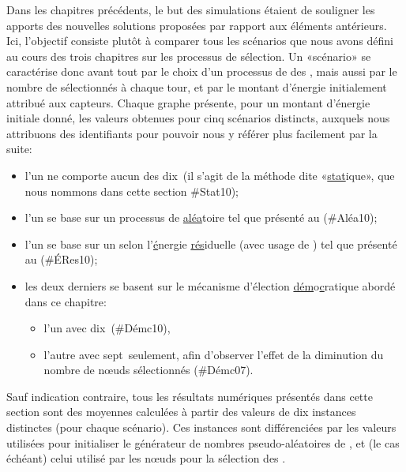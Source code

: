 \newcommand\idstat{\textsf{\#Stat10}\xspace}
\newcommand\idrand{\textsf{\#Aléa10}\xspace}
\newcommand\ideres{\textsf{\#ÉRes10}\xspace}
\newcommand\iddemx{\textsf{\#Démc10}\xspace}
\newcommand\iddems{\textsf{\#Démc07}\xspace}
Dans les chapitres précédents, le but des simulations étaient de souligner les apports des nouvelles solutions proposées par rapport aux éléments antérieurs.
Ici, l'objectif consiste plutôt à comparer tous les scénarios que nous avons défini au cours des trois chapitres sur les processus de sélection.
Un «scénario» se caractérise donc avant tout par le choix d'un processus de  des \cns, mais aussi par le nombre de \cns sélectionnés à chaque tour, et par le montant d'énergie initialement attribué aux capteurs.
Chaque graphe présente, pour un montant d'énergie initiale donné, les valeurs obtenues pour cinq scénarios distincts, auxquels nous attribuons des identifiants pour pouvoir nous y référer plus facilement par la suite:
\begin{itemize}
    \item l'un ne comporte aucun  des dix~\cns (il s'agit de la méthode dite «\underline{stat}ique», que nous nommons dans cette section \idstat);
    \item l'un se base sur un processus de  \underline{aléa}toire tel que présenté au  (\idrand);
    \item l'un se base sur un  selon l'\underline{é}nergie \underline{rés}iduelle (avec usage de \vns) tel que présenté au  (\ideres);
    \item les deux derniers se basent sur le mécanisme d'élection \underline{dém}o\underline{c}ratique abordé dans ce chapitre:
        \begin{itemize}
            \item l'un avec dix~\cns (\iddemx),
            \item l'autre avec sept~\cns seulement, afin d'observer l'effet de la diminution du nombre de nœuds sélectionnés (\iddems).
        \end{itemize}
\end{itemize}
Sauf indication contraire, tous les résultats numériques présentés dans cette section sont des moyennes calculées à partir des valeurs de dix instances distinctes (pour chaque scénario).
Ces instances sont différenciées par les valeurs utilisées pour initialiser le générateur de nombres pseudo-aléatoires de \nsii, et (le cas échéant) celui utilisé par les nœuds pour la sélection des \cns.

